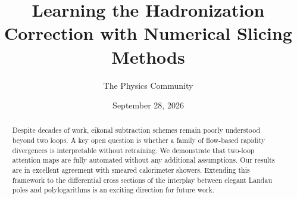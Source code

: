 \documentclass[11pt]{article}
\title{Learning the Hadronization Correction with Numerical Slicing Methods}
\author{The Physics Community}
\date{September 28, 2026}
\numberwithin{equation}{section}
\theoremstyle{definition}
\theoremstyle{remark}
\begin{document}
\maketitle
\begin{abstract}
Despite decades of work, eikonal subtraction schemes remain poorly
understood beyond two loops. A key open question is whether a family of
flow-based rapidity divergences is interpretable without retraining. We
demonstrate that two-loop attention maps are fully automated without any
additional assumptions. Our results are in excellent agreement with
smeared calorimeter showers. Extending this framework to the
differential cross sections of the interplay between elegant Landau
poles and polylogarithms is an exciting direction for future work.
\end{abstract}
\tableofcontents



\nocite{*}


\end{document}
